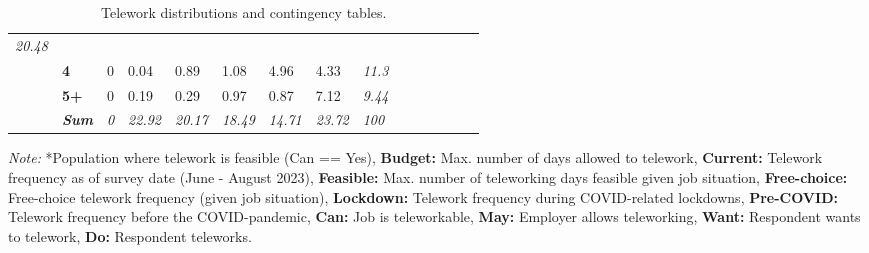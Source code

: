 \begin{table}
{\begin{threeparttable}
\begin{tabular}{lllllllllllllll}
  \textit{20.48} &
   &
   &
   &
   &
   &
  \textit{} \\
 &
  \textbf{4} &
  \cellcolor[HTML]{FFFFFF}0 &
  \cellcolor[HTML]{FFFFFF}0.04 &
  \cellcolor[HTML]{FAFAFA}0.89 &
  \cellcolor[HTML]{F8F8F8}1.08 &
  \cellcolor[HTML]{DEDEDE}4.96 &
  \cellcolor[HTML]{E3E3E3}4.33 &
  \textit{11.3} &
   &
   &
   &
   &
   &
  \textit{} \\
 &
  \textbf{5+} &
  \cellcolor[HTML]{FFFFFF}0 &
  \cellcolor[HTML]{FEFEFE}0.19 &
  \cellcolor[HTML]{FEFEFE}0.29 &
  \cellcolor[HTML]{F9F9F9}0.97 &
  \cellcolor[HTML]{FAFAFA}0.87 &
  \cellcolor[HTML]{D0D0D0}7.12 &
  \textit{9.44} &
   &
   &
   &
   &
   &
  \textit{} \\
\textit{} &
  \textit{\textbf{Sum}} &
  \textit{0} &
  \textit{22.92} &
  \textit{20.17} &
  \textit{18.49} &
  \textit{14.71} &
  \textit{23.72} &
  \textit{100} &
  \textit{} &
  \textit{} &
  \textit{} &
  \textit{} &
  \textit{} &
  \textit{} \\
  \bottomrule
\end{tabular}%
\begin{tablenotes}[flushleft]
    \item \textit{Note:} *Population where telework is feasible (Can == Yes), \textbf{Budget:} Max. number of days allowed to telework, \textbf{Current:} Telework frequency as of survey date (June - August 2023), \textbf{Feasible:} Max. number of teleworking days feasible given job situation, \textbf{Free-choice:} Free-choice telework frequency (given job situation), \textbf{Lockdown:} Telework frequency during COVID-related lockdowns, \textbf{Pre-COVID:} Telework frequency before the COVID-pandemic, \textbf{Can:} Job is teleworkable, \textbf{May:} Employer allows teleworking, \textbf{Want:} Respondent wants to telework, \textbf{Do:} Respondent teleworks.
\end{tablenotes}
\end{threeparttable}%
}
\caption{\label{tab:wfh-table-weighted-combined} Telework distributions and contingency tables.}
\end{table}
